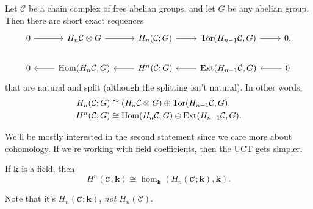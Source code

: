 \documentclass[twoside,10pt]{article}
\begin{document}
\begin{thrm}
Let $\mathcal{C}$ be a chain complex of free abelian groups, and let $G$ be any abelian group. Then there are short exact sequences
\[
\begin{tikzcd}
	0 \rar & H_{n}\mathcal{C} \otimes_{}G \rar & H_{n}(\mathcal{C};G) \rar & \tor(H_{n-1}\mathcal{C},G) \rar & 0, \\
	0 & \lar \hom(H_{n}\mathcal{C},G) & \lar H^{n}(\mathcal{C};G) & \lar \ext(H_{n-1}\mathcal{C},G) & \lar 0
\end{tikzcd}
\] that are natural and split (although the splitting isn't natural). In other words,
\begin{align*}
	H_{n}(\mathcal{C};G) &\cong (H_{n}\mathcal{C} \otimes_{}G) \oplus \operatorname{Tor}(H_{n-1}\mathcal{C},G),\\
	H^{n}(\mathcal{C};G) &\cong \operatorname{Hom}(H_{n}\mathcal{C},G) \oplus \operatorname{Ext}(H_{n-1}\mathcal{C},G).
\end{align*}
\end{thrm}

We'll be mostly interested in the second statement since we care more about cohomology. If we're working with field coefficients, then the UCT gets simpler.

\begin{thrm}
If $\mathbf{k}$ is a field, then
\[
H^{n}(\mathcal{C},\mathbf{k}) \cong \hom_{\mathbf{k}}\left( H_{n}(\mathcal{C};\mathbf{k}),\mathbf{k} \right).
\] 
\end{thrm}
Note that it's $H_{n}(\mathcal{C};\mathbf{k})$, \emph{not} $H_{n}(\mathcal{C})$.
\end{document}
